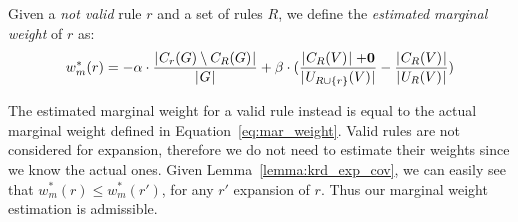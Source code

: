 \begin{definition}\label{def:est_res_wei}
	Given a \emph{not valid} rule $r$ and a set of rules $R$, we define the \emph{estimated marginal weight} of $r$ as:
	\begin{equation*}
	w_m^*(r) = - \alpha \cdot \frac{\mid \hspace{-0.5ex} C_{r}(G) \setminus C_{R}(G) \hspace{-0.5ex} \mid}{\mid \hspace{-0.5ex} G \hspace{-0.5ex} \mid} + \beta \cdot (\frac{\mid \hspace{-0.5ex} C_R(V) \hspace{-0.5ex} \mid + \textbf{0}}{\mid \hspace{-0.5ex} U_{R \cup \{r\}}(V) \hspace{-0.5ex} \mid} - \frac{\mid \hspace{-0.5ex} C_{R}(V) \hspace{-0.5ex} \mid}{\mid \hspace{-0.5ex} U_{R}(V) \hspace{-0.5ex} \mid})
	\end{equation*}
\end{definition}

The estimated marginal weight for a valid rule instead is equal to the actual marginal weight defined in Equation~\ref{eq:mar_weight}. Valid rules are not considered for expansion, therefore we do not need to estimate their weights since we know the actual ones. Given Lemma~\ref{lemma:krd_exp_cov}, we can easily see that $w_m^*(r) \leq w_m^*(r')$, for any $r'$ expansion of $r$. Thus our marginal weight estimation is admissible.

